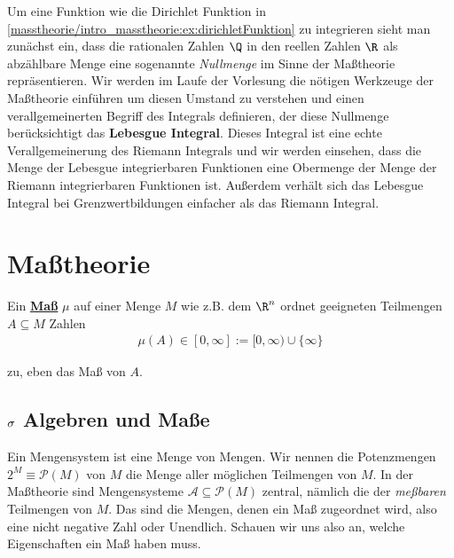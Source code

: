 \par
Um eine Funktion wie die Dirichlet Funktion in \cref{masstheorie/intro_masstheorie:ex:dirichletFunktion} zu integrieren sieht man zunächst ein, dass die rationalen Zahlen \(\Q\) in den reellen Zahlen \(\R\) als abzählbare Menge eine sogenannte \emph{Nullmenge} im Sinne der Maßtheorie repräsentieren.
Wir werden im Laufe der Vorlesung die nötigen Werkzeuge der Maßtheorie einführen um diesen Umstand zu verstehen und einen verallgemeinerten Begriff des Integrals definieren, der diese Nullmenge berücksichtigt   das \textbf{Lebesgue Integral}.
Dieses Integral ist eine echte Verallgemeinerung des Riemann Integrals und wir werden einsehen, dass die Menge der Lebesgue integrierbaren Funktionen eine Obermenge der Menge der Riemann integrierbaren Funktionen ist.
Außerdem verhält sich das Lebesgue Integral bei Grenzwertbildungen einfacher als das Riemann Integral.


\section{Maßtheorie}
\label{\detokenize{masstheorie/masstheorie:masztheorie}}\label{\detokenize{masstheorie/masstheorie::doc}}
\par
Ein \href{https://de.wikipedia.org/wiki/Ma\%c3\%9f\_(Mathematik)}{\textbf{Maß}} \(\mu\) auf einer Menge \(M\) wie z.B. dem \(\R^n\)
ordnet geeigneten Teilmengen \(A\subseteq M\)
Zahlen
\begin{align*}
\mu(A)\in[0,\infty]:=[0,\infty)\cup\{\infty\}
\end{align*}
\par
zu, eben das Maß von \(A\).


\subsection{\protect\(\sigma\protect\) Algebren und Maße}
\label{\detokenize{masstheorie/masstheorie:sigma-algebren-und-masze}}
\par
Ein Mengensystem ist eine Menge von Mengen. Wir nennen die Potenzmengen \(2^M \equiv\mathcal{P}(M)\) von \(M\) die Menge aller möglichen Teilmengen von \(M\). In der Maßtheorie sind Mengensysteme \(\mathcal{A} \subseteq \mathcal{P}(M)\) zentral, nämlich die der \emph{meßbaren} Teilmengen von \(M\). Das sind die Mengen, denen ein Maß zugeordnet wird, also eine nicht negative Zahl oder Unendlich. Schauen wir uns also an, welche Eigenschaften ein Maß haben muss.

